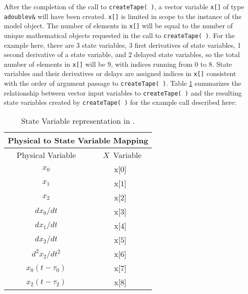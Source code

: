 After the completion of the call to \texttt{createTape(~)}, a vector
variable \texttt{x[]} of type \texttt{adoublev\&} will have been created.
\texttt{x[]} is limited in scope to the instance of the model object.  The
number of elements in \texttt{x[]} will be equal to the number of unique
mathematical objects requested in the call to \texttt{createTape(~)}.
For the example here, there are 3 state variables, 3 first derivatives
of state variables, 1 second derivative of a state variable, and 2
delayed state variables, so the total number of elements in \texttt{x[]}
will be 9, with indices running from 0 to 8.  State variables and their
derivatives or delays are assigned indices in \texttt{x[]} consistent with
the order of argument passage to \texttt{createTape(~)}.  Table \ref{tab:state:var}
summarizes the relationship between vector input variables to \texttt{createTape(~)}
and the resulting state variables created by \texttt{createTape(~)} for the
example call described here:
\begin{table}[h]
    \caption{State Variable representation in \FDA.}
    \label{tab:state:var}
    \begin{center}
    \begin{tabular}{|c|c|}
    \hline \multicolumn{2}{|c|}{\bf Physical to State Variable Mapping}\\
%
    \hline \multicolumn{1}{|c|}{Physical Variable} & \multicolumn{1}{|c|}{~$X$~Variable} \\
%
    \hline
    \hline $x_0$ & x[$0$] \\
    \hline $x_1$ & x[$1$] \\
    \hline $x_2$ & x[$2$] \\
    \hline ${dx_0}/{dt}$ & x[$3$] \\
    \hline ${dx_1}/{dt}$ & x[$4$] \\
    \hline ${dx_2}/{dt}$ & x[$5$] \\
    \hline ${d^2x_2}/{dt^2}$ & x[$6$] \\
    \hline $x_0(t-\tau_0)$ & x[$7$] \\
    \hline $x_2(t-\tau_2)$ & x[$8$] \\
    \hline
    \end{tabular}
    \end{center}
\end{table}

